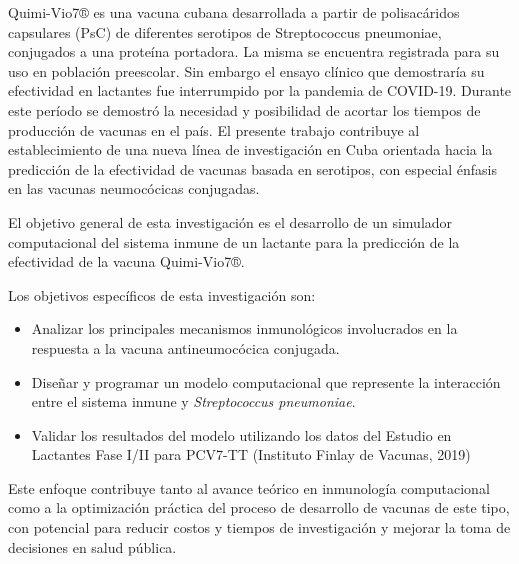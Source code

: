 Quimi-Vio7® es una vacuna cubana desarrollada a partir de polisacáridos capsulares (PsC) de diferentes serotipos de Streptococcus pneumoniae, conjugados a una proteína portadora. 
La misma se encuentra registrada para su uso en población preescolar. Sin embargo el ensayo clínico que demostraría su efectividad en lactantes fue interrumpido por la pandemia de COVID-19. Durante este período se demostró la necesidad y posibilidad de acortar los tiempos de producción de vacunas en el país. El presente trabajo contribuye al establecimiento de una nueva línea de investigación en Cuba orientada hacia la predicción de la efectividad de vacunas basada en serotipos, con especial énfasis en las vacunas neumocócicas conjugadas.


\vspace{0.5cm}

El objetivo general de esta investigación es el desarrollo de un simulador computacional del sistema inmune de un lactante para la predicción de la efectividad de la vacuna Quimi-Vio7®.

Los objetivos específicos de esta investigación son:
\begin{itemize}
    \item Analizar los principales mecanismos inmunológicos involucrados en la respuesta a la vacuna antineumocócica conjugada.
    \item Diseñar y programar un modelo computacional que represente la interacción entre el sistema inmune y \textit{Streptococcus pneumoniae}.
    
    \item Validar los resultados del modelo utilizando los datos del Estudio en Lactantes Fase I/II para PCV7-TT (Instituto Finlay de Vacunas, 2019)
\end{itemize}

Este enfoque contribuye tanto al avance teórico en inmunología computacional como a la optimización práctica del proceso de desarrollo de vacunas de este tipo, con potencial para reducir costos y tiempos de investigación y mejorar la toma de decisiones en salud pública.



\vspace{0.5cm}

